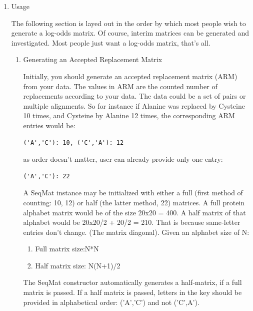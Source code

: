 \documentclass{report}
\begin{document}
\begin{enumerate}
\begin{enumerate}
    The \verb|alphabet| optional argument is a string of all characters in the alphabet. If supplied, the order of letters along the axes is taken from the string, rather than by alphabetical order.

  \end{enumerate}

\item Usage

   The following section is layed out in the order by which most people wish to generate a log-odds matrix. Of course, interim matrices can be generated and
   investigated. Most people just want a log-odds matrix, that's all. 
   
   \begin{enumerate}

   \item Generating an Accepted Replacement Matrix

   Initially, you should generate an accepted replacement matrix (ARM) from your data. The values in ARM are the counted number of replacements according to your data. The data could be a set of pairs or multiple alignments. So for instance if Alanine was replaced by Cysteine 10 times, and Cysteine by Alanine 12 times, the corresponding ARM entries would be: 

\begin{verbatim}
('A','C'): 10, ('C','A'): 12 
\end{verbatim}

as order doesn't matter, user can already provide only one entry: 

\begin{verbatim}
('A','C'): 22 
\end{verbatim}

 A SeqMat instance may be initialized with either a full (first method of counting: 10, 12) or half (the latter method, 22) matrices. A full protein
   alphabet matrix would be of the size 20x20 = 400. A half matrix of that alphabet would be 20x20/2 + 20/2 = 210. That is because same-letter entries don't
   change. (The matrix diagonal). Given an alphabet size of N: 

   \begin{enumerate}
     \item Full matrix size:N*N 

     \item Half matrix size: N(N+1)/2 
   \end{enumerate}

The SeqMat constructor automatically generates a half-matrix, if a full matrix is passed. If a half matrix is passed, letters in the key should be provided in alphabetical order: ('A','C') and not ('C',A'). 


\end{enumerate}
\end{enumerate}
\end{document}

